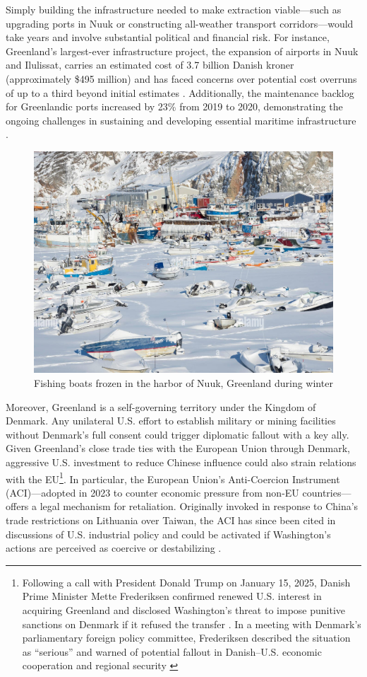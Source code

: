 \documentclass{adonis}
\begin{document}
    Simply building the infrastructure needed to make extraction viable—such as upgrading ports in Nuuk or constructing all-weather transport corridors—would take years and involve substantial political and financial risk. For instance, Greenland’s largest-ever infrastructure project, the expansion of airports in Nuuk and Ilulissat, carries an estimated cost of 3.7 billion Danish kroner (approximately \$495 million) and has faced concerns over potential cost overruns of up to a third beyond initial estimates \citep{asce2022airports, arctictoday2022overruns}. Additionally, the maintenance backlog for Greenlandic ports increased by 23\% from 2019 to 2020, demonstrating the ongoing challenges in sustaining and developing essential maritime infrastructure \citep{highnorth2021ports}.

     \begin{figure}[H]
        \centering
        \includegraphics[width=0.58\linewidth]{frozen-harbor-with-fishing-boats-greenland-WAK1F6.jpg}
        \caption{Fishing boats frozen in the harbor of Nuuk, Greenland during winter \citep{alamy_wak1f6}}
        \label{fig:enter-label}
    \end{figure}

    Moreover, Greenland is a self-governing territory under the Kingdom of Denmark. Any unilateral U.S. effort to establish military or mining facilities without Denmark’s full consent could trigger diplomatic fallout with a key ally. Given Greenland’s close trade ties with the European Union through Denmark, aggressive U.S. investment to reduce Chinese influence could also strain relations with the EU\footnote{Following a call with President Donald Trump on January 15, 2025, Danish Prime Minister Mette Frederiksen confirmed renewed U.S. interest in acquiring Greenland and disclosed Washington’s threat to impose punitive sanctions on Denmark if it refused the transfer \citep{earle2025greenland}. In a meeting with Denmark’s parliamentary foreign policy committee, Frederiksen described the situation as “serious” and warned of potential fallout in Danish–U.S. economic cooperation and regional security \citep{reuters2025greenland}}. In particular, the European Union’s Anti-Coercion Instrument (ACI)—adopted in 2023 to counter economic pressure from non-EU countries—offers a legal mechanism for retaliation. Originally invoked in response to China’s trade restrictions on Lithuania over Taiwan, the ACI has since been cited in discussions of U.S. industrial policy and could be activated if Washington’s actions are perceived as coercive or destabilizing \citep{wu2023aci, europarl2023aci}. 
\end{document}
